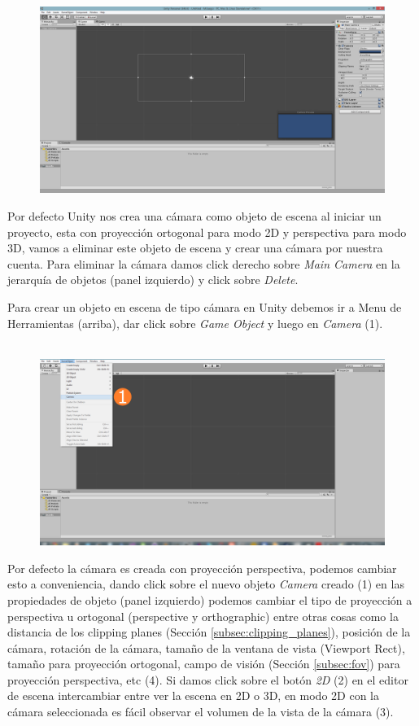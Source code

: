 \begin{figure}[H]
\centering
\includegraphics[width=0.80\linewidth]{media/1_ss3.jpg} 
\label{fig:unity_3}
\end{figure}

Por defecto Unity nos crea una cámara como objeto de escena al iniciar un proyecto, esta con proyección ortogonal para modo 2D y perspectiva para modo 3D, vamos a eliminar este objeto de escena y crear una cámara por nuestra cuenta. Para eliminar la cámara damos click derecho sobre \emph{Main Camera} en la jerarquía de objetos (panel izquierdo) y click sobre \emph{Delete}.

Para crear un objeto en escena de tipo cámara en Unity debemos ir a Menu de Herramientas (arriba), dar click sobre \emph{Game Object} y luego en \emph{Camera} (1).\\~

\begin{figure}[H]
\centering
\includegraphics[width=0.80\linewidth]{media/1_ss4.jpg} 
\label{fig:unity_4}
\end{figure}

Por defecto la cámara es creada con proyección perspectiva, podemos cambiar esto a conveniencia, dando click sobre el nuevo objeto \emph{Camera} creado (1) en las propiedades de objeto (panel izquierdo) podemos cambiar el tipo de proyección a perspectiva u ortogonal (perspective y orthographic) entre otras cosas como la distancia de los clipping planes (Sección \ref{subsec:clipping_planes}), posición de la cámara, rotación de la cámara, tamaño de la ventana de vista (Viewport Rect), tamaño para proyección ortogonal, campo de visión (Sección \ref{subsec:fov}) para proyección perspectiva, etc (4). Si damos click sobre el botón \emph{2D} (2) en el editor de escena intercambiar entre ver la escena en 2D o 3D, en modo 2D con la cámara seleccionada es fácil observar el volumen de la vista de la cámara (3).

